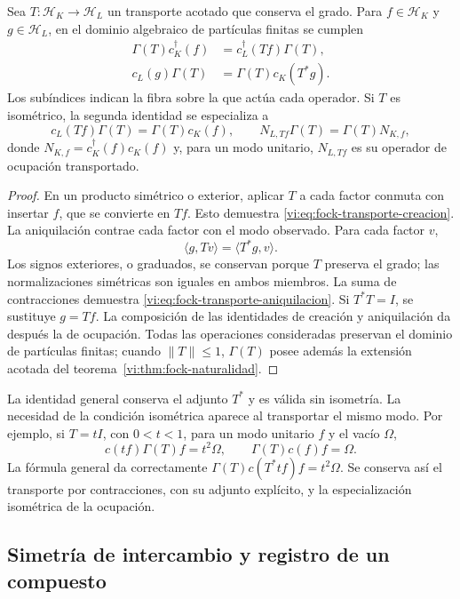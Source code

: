 \begin{proposition}
\label{vi:prop:fock-transporte-adjunto}
Sea \(T:\mathcal H_K\to\mathcal H_L\) un transporte acotado
que conserva el grado. Para \(f\in\mathcal H_K\) y
\(g\in\mathcal H_L\), en el dominio algebraico de partículas
finitas se cumplen
\begin{align}
 \Gamma(T)c_K^\dagger(f)
 &=c_L^\dagger(Tf)\Gamma(T),
 \label{vi:eq:fock-transporte-creacion}\\
 c_L(g)\Gamma(T)
 &=\Gamma(T)c_K(T^*g).
 \label{vi:eq:fock-transporte-aniquilacion}
\end{align}
Los subíndices indican la fibra sobre la que actúa cada operador.
Si \(T\) es isométrico, la segunda identidad se especializa a
\[
 c_L(Tf)\Gamma(T)=\Gamma(T)c_K(f),
 \qquad
 N_{L,Tf}\Gamma(T)=\Gamma(T)N_{K,f},
\]
donde \(N_{K,f}=c_K^\dagger(f)c_K(f)\) y, para un modo unitario,
\(N_{L,Tf}\) es su operador de ocupación transportado.
\end{proposition}
\begin{proof}
En un producto simétrico o exterior, aplicar \(T\) a cada factor
conmuta con insertar \(f\), que se convierte en \(Tf\). Esto
demuestra \eqref{vi:eq:fock-transporte-creacion}. La aniquilación
contrae cada factor con el modo observado. Para cada factor \(v\),
\[
 \langle g,Tv\rangle=\langle T^*g,v\rangle.
\]
Los signos exteriores, o graduados, se conservan porque \(T\)
preserva el grado; las normalizaciones simétricas son iguales en
ambos miembros. La suma de contracciones demuestra
\eqref{vi:eq:fock-transporte-aniquilacion}. Si \(T^*T=I\), se
sustituye \(g=Tf\). La composición de las identidades de creación
y aniquilación da después la de ocupación. Todas las operaciones
consideradas preservan el dominio de partículas finitas; cuando
\(\|T\|\le1\), \(\Gamma(T)\) posee además la extensión acotada
del teorema~\ref{vi:thm:fock-naturalidad}.
\end{proof}

La identidad general conserva el adjunto \(T^*\) y es válida sin
isometría. La necesidad de la condición isométrica aparece al
transportar el mismo modo. Por ejemplo, si \(T=tI\), con
\(0<t<1\), para un modo unitario \(f\) y el vacío \(\Omega\),
\[
 c(tf)\Gamma(T)f=t^2\Omega,
 \qquad \Gamma(T)c(f)f=\Omega.
\]
La fórmula general da correctamente
\(\Gamma(T)c(T^*tf)f=t^2\Omega\). Se conserva así el
transporte por contracciones, con su adjunto explícito, y la
especialización isométrica de la ocupación.

\subsection{Simetría de intercambio y registro de un compuesto}
\label{vi:subsec:pauli-composicion}


